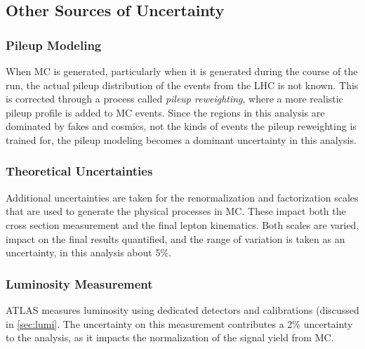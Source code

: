 \subsection{Other Sources of Uncertainty}

\subsubsection{Pileup Modeling}
When \ac{MC} is generated, particularly when it is generated during the course of the run, the actual pileup distribution of the events from the \ac{LHC} is not known. This is corrected through a process called \emph{pileup reweighting}, where a more realistic pileup profile is added to \ac{MC} events. Since the regions in this analysis are dominated by fakes and cosmics, not the kinds of events the pileup reweighting is trained for, the pileup modeling becomes a dominant uncertainty in this analysis.

\subsubsection{Theoretical Uncertainties}

Additional uncertainties are taken for the renormalization and factorization scales that are used to generate the physical processes in \ac{MC}. These impact both the cross section measurement and the final lepton kinematics. Both scales are varied, impact on the final results quantified, and the range of variation is taken as an uncertainty, in this analysis about 5\%. 

\subsubsection{Luminosity Measurement}
\ac{ATLAS} measures luminosity using dedicated detectors and calibrations (discussed in \autoref{sec:lumi}. The uncertainty on this measurement contributes a 2\% uncertainty to the analysis, as it impacts the normalization of the signal yield from \ac{MC}.





